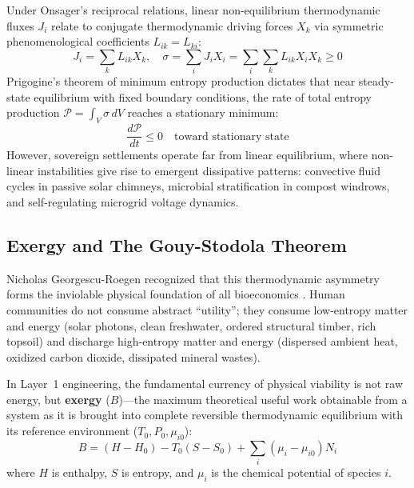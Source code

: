 Under Onsager's reciprocal relations, linear non-equilibrium thermodynamic fluxes $J_i$ relate to conjugate thermodynamic driving forces $X_k$ via symmetric phenomenological coefficients $L_{ik} = L_{ki}$:
\begin{equation}
J_i = \sum_{k} L_{ik} X_k, \quad \sigma = \sum_{i} J_i X_i = \sum_{i} \sum_{k} L_{ik} X_i X_k \ge 0
\label{eq:onsager_relations}
\end{equation}
Prigogine's theorem of minimum entropy production dictates that near steady-state equilibrium with fixed boundary conditions, the rate of total entropy production $\mathcal{P} = \int_V \sigma \, dV$ reaches a stationary minimum:
\begin{equation}
\frac{d\mathcal{P}}{dt} \le 0 \quad \text{toward stationary state}
\label{eq:prigogine_min_entropy}
\end{equation}
However, sovereign settlements operate far from linear equilibrium, where non-linear instabilities give rise to emergent dissipative patterns: convective fluid cycles in passive solar chimneys, microbial stratification in compost windrows, and self-regulating microgrid voltage dynamics.

\subsection{Exergy and The Gouy-Stodola Theorem}
Nicholas Georgescu-Roegen recognized that this thermodynamic asymmetry forms the inviolable physical foundation of all bioeconomics \cite{georgescu1971entropy}. Human communities do not consume abstract ``utility''; they consume low-entropy matter and energy (solar photons, clean freshwater, ordered structural timber, rich topsoil) and discharge high-entropy matter and energy (dispersed ambient heat, oxidized carbon dioxide, dissipated mineral wastes). 

In Layer~1 engineering, the fundamental currency of physical viability is not raw energy, but \textbf{exergy} ($B$)---the maximum theoretical useful work obtainable from a system as it is brought into complete reversible thermodynamic equilibrium with its reference environment ($T_0, P_0, \mu_{i0}$):
\begin{equation}
B = (H - H_0) - T_0(S - S_0) + \sum_{i} (\mu_i - \mu_{i0})N_i
\label{eq:exergy_fundamental}
\end{equation}
where $H$ is enthalpy, $S$ is entropy, and $\mu_i$ is the chemical potential of species $i$.

